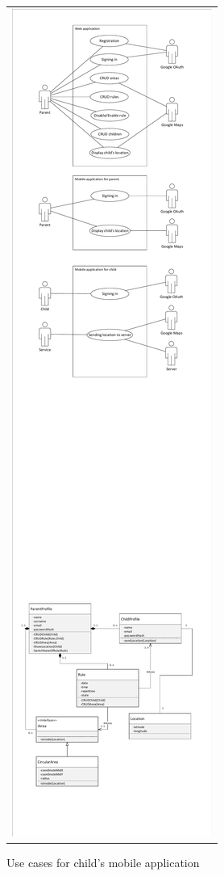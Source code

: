 \documentclass{sprawozdanie-agh}
\begin{document}
		\begin{figure}[H] 
			\centering
			\begin{tabular}{c}
				\includegraphics[width=.80\textwidth]{childUseCase} 
			\end{tabular} 
		\caption{Use cases for child's mobile application}
		\end{figure}
\end{document}
